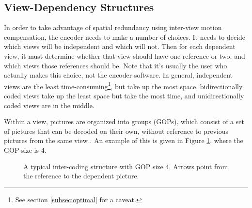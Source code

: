 \documentclass{sig-alternate-05-2015}
\begin{document}
\subsection{View-Dependency Structures}
\label{subsec:depends}
In order to take advantage of spatial redundancy using inter-view motion
compensation, the encoder needs to make a number of choices. It needs to
decide which views will be independent and which will not. Then for each
dependent view, it must determine whether that view should have one reference
or two, and which views those references should be. Note that it's usually
the user who actually makes this choice, not the encoder software. In
general, independent views are the least time-consuming\footnote{See section
\ref{subsec:optimal} for a caveat.}, but take up the most space,
bidirectionally coded views take up the least space but take the most time,
and unidirectionally coded views are in the middle.

Within a view, pictures are organized into groups (GOPs), which consist of a
set of pictures that can be decoded on their own, without reference to
previous pictures from the same view \cite{vetro:overview}. An example of
this is given in Figure \ref{fig:inter}, where the GOP-size is 4.

\begin{figure}[H]
\begin{center}
\end{center}
\caption{
A typical inter-coding structure with GOP size 4. Arrows point from the
reference to the dependent picture.
}
\label{fig:inter}
\end{figure}
\end{document}
